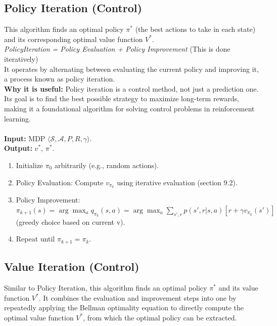 \documentclass[12pt]{article}
\begin{document}
\subsection{Policy Iteration (Control)} 
This algorithm finds an optimal policy $\pi^*$ (the best actions to take in each state) and its corresponding optimal value function $V^*$. \\

\textit{PolicyIteration = Policy Evaluation + Policy Improvement}  (This is done iteratively)\\

It operates by alternating between evaluating the current policy and improving it, a process known as policy iteration.\\

\textbf{Why it is useful:}
Policy iteration is a control method, not just a prediction one. Its goal is to find the best possible strategy to maximize long-term rewards, making it a foundational algorithm for solving control problems in reinforcement learning.\\ \\
\textbf{Input:} MDP $\langle \mathcal{S}, \mathcal{A}, P, R, \gamma \rangle$.\\

\textbf{Output:} $v^*$, $\pi^*$. 
\begin{enumerate}
    \item Initialize $\pi_0$ arbitrarily (e.g., random actions).
    \item Policy Evaluation: Compute $v_{\pi_k}$ using iterative evaluation (section 9.2).
    \item Policy Improvement: $\pi_{k+1}(s) = \arg\max_a q_{\pi_k}(s,a) = \arg\max_a \sum_{s',r} p(s',r|s,a) [r + \gamma v_{\pi_k}(s')]$ (greedy choice based on current v).
    \item Repeat until $\pi_{k+1} = \pi_k$.
\end{enumerate}

\subsection{Value Iteration (Control)}
Similar to Policy Iteration, this algorithm finds an optimal policy $\pi^*$ and its value function $V^*$. It combines the evaluation and improvement steps into one by repeatedly applying the Bellman optimality equation to directly compute the optimal value function $V^*$, from which the optimal policy can be extracted.\\
\end{document}
